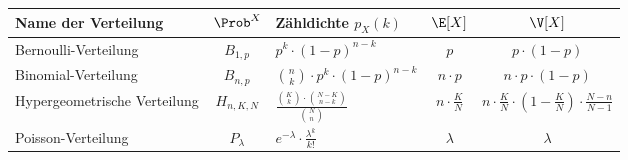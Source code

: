 \begin{table}
	\renewcommand{\arraystretch}{1.6}
	\centering
	\begin{tabular}{l | c | l | c | c}
		Name der Verteilung			&	$\Prob^X$		& 	Zähldichte $p_X(k)$										& $\E[X]$ 				&	$\V[X]$
	\\ \hline
		Bernoulli-Verteilung			&	$B_{1, p}$ 	& 	$p^k \cdot (1 - p)^{n - k}$ 									& $p$ 				&	$p \cdot (1 - p)$
	\\
		Binomial-Verteilung			&	$B_{n, p}$ 	& 	${n \choose k} \cdot p^k \cdot (1 - p)^{n - k}$ 					& $n \cdot p$ 			&	$n \cdot p \cdot (1 - p)$
	\\
		Hypergeometrische Verteilung	&	$H_{n, K, N}$	& 	$\frac{{K \choose k} \cdot {N - K \choose n - k}}{{N \choose n}}$ 	& $n \cdot \frac{K}{N}$	&	$n \cdot \frac{K}{N} \cdot (1 - \frac{K}{N}) \cdot \frac{N - n}{N - 1}$
	\\
		Poisson-Verteilung			&	$P_\lambda$ 	& 	$e^{-\lambda} \cdot \frac{\lambda^k}{k!}$						& $\lambda$ 			& 	$\lambda$
	\end{tabular}
\end{table}